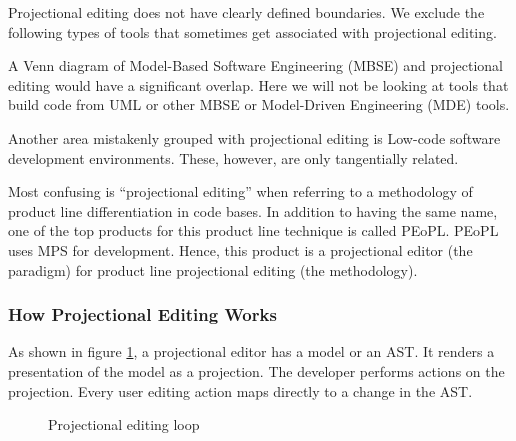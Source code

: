Projectional editing does not have clearly defined boundaries.
We exclude the following types of tools that sometimes get associated with projectional editing.

A Venn diagram of Model-Based Software Engineering (MBSE) and projectional editing would have a significant overlap.
Here we will not be looking at tools that build code from UML or other MBSE or Model-Driven Engineering (MDE) tools.

Another area mistakenly grouped with projectional editing is Low-code software development environments.
These, however, are only tangentially related.

Most confusing is ``projectional editing'' when referring to a methodology of product line differentiation in code bases.
In addition to having the same name, one of the top products for this product line technique is called PEoPL.
PEoPL uses MPS for development.
Hence, this product is a projectional editor (the paradigm) for product line projectional editing (the methodology).

\subsubsection{How Projectional Editing Works}

As shown in figure \ref{fig:projectionalEditing_loop}, a projectional editor has a model or an AST.
It renders a presentation of the model as a projection.
The developer performs actions on the projection.
Every user editing action maps directly to a change in the AST.

\begin{figure}
    \centering
    \caption{Projectional editing loop}
    \label{fig:projectionalEditing_loop}
\end{figure}

